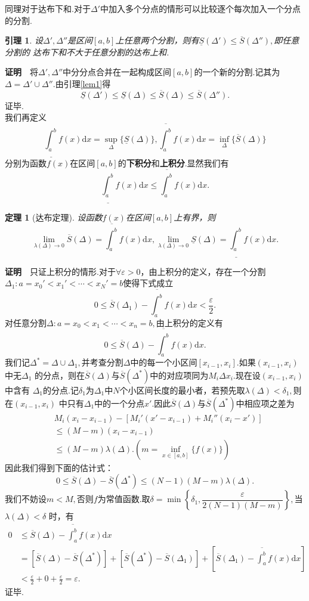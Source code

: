 \documentclass[UTF8]{article}
\newcommand{\dx}{\mathrm{d}x}
\newcommand{\zm}{\textbf{证明}$\quad$}
\newtheorem{thm}{\hspace{2em}定理}[section]
\newtheorem{lem}{\hspace{2em}引理}[section]
\begin{document}
    同理对于达布下和.对于$\Delta'$中加入多个分点的情形可以比较逐个每次加入一个分点的分割.
    \begin{lem}
      设$\Delta',\Delta''$是区间$[a,b]$上任意两个分割，则有$\underline{S}(\Delta')\le\overline{S}(\Delta''),$即任意分割的
      达布下和不大于任意分割的达布上和.
    \end{lem}
    \zm 将$\Delta',\Delta''$中分分点合并在一起构成区间$[a,b]$的一个新的分割.记其为$\Delta=\Delta'\cup\Delta''$.由引理\ref{lem1}得
    $$\underline{S}(\Delta')\le\underline{S}(\Delta)\le\overline{S}(\Delta)\le\overline{S}(\Delta'').$$证毕.\\
    我们再定义
    $$\underline{\int_a^b}f(x)\dx=\sup_\Delta\{\underline{S}(\Delta)\},\overline{\int_a^b}f(x)\dx=\inf_\Delta\{\overline{S}(\Delta)\}$$
    分别为函数$f(x)$在区间$[a,b]$的\textbf{下积分}和\textbf{上积分}.显然我们有
    $$\underline{\int_a^b}f(x)\dx\le\overline{\int_a^b}f(x)\dx.$$
    \begin{thm}[\color{red}达布定理]
      设函数$f(x)$在区间$[a,b]$上有界，则
      $$\lim_{\lambda(\Delta)\to0}\overline{S}(\Delta)=\overline{\int_a^b}f(x)\dx,
      \lim_{\lambda(\Delta)\to0}\underline{S}(\Delta)=\underline{\int_a^b}f(x)\dx.$$
    \end{thm}
    \zm 只证上积分的情形.对于$\forall\varepsilon>0$，由上积分的定义，存在一个分割$\Delta_1:a=x_0'<x_1'<\cdots<x_N'=b$使得下式成立
    $$0\le\overline{S}(\Delta_1)-\overline{\int_a^b}f(x)\dx<\frac{\varepsilon}{2}.$$
    对任意分割$\Delta:a=x_0<x_1<\cdots<x_n=b,$由上积分的定义有
    $$0\le\overline{S}(\Delta)-\overline{\int_a^b}f(x)\dx.$$
    我们记$\Delta^*=\Delta\cup\Delta_1,$并考查分割$\Delta$中的每一个小区间$[x_{i-1},x_i].$如果$(x_{i-1},x_i)$中无$\Delta_1$
    的分点，则在$\overline{S}(\Delta)$与$\overline{S}(\Delta^*)$中的对应项同为$M_i\Delta x_i.$现在设$(x_{i-1},x_i)$中含有
    $\Delta_1$的分点.记$\delta_1$为$\Delta_1$中$N$个小区间长度的最小者，若预先取$\lambda(\Delta)<\delta_1,$则在$(x_{i-1},x_i)$
    中只有$\Delta_1$中的一个分点$x'.$因此$\overline{S}(\Delta)$与$\overline{S}(\Delta^*)$中相应项之差为
    \begin{align*}
      &M_i(x_i-x_{i-1})-[M_i'(x'-x_{i-1})+M_i''(x_i-x')]\\
      &\le(M-m)(x_i-x_{i-1})\\
      &\le(M-m)\lambda(\Delta).(m=\inf_{x\in[a,b]}\{f(x)\})
    \end{align*}
    因此我们得到下面的估计式：
    $$0\le\overline{S}(\Delta)-\overline{S}(\Delta^*)\le(N-1)(M-m)\lambda(\Delta).$$
    我们不妨设$m<M,$否则$f$为常值函数.取$\delta=\min\left\{\delta_1,\dfrac{\varepsilon}{2(N-1)(M-m)}\right\},$当$\lambda(\Delta)<\delta$
    时，有
    \begin{align*}
      0&\le\overline{S}(\Delta)-\overline{\int_a^b}f(x)\dx\\
      &=[\overline{S}(\Delta)-\overline{S}(\Delta^*)]+[\overline{S}(\Delta^*)-\overline{S}(\Delta_1)]+
      [\overline{S}(\Delta_1)-\overline{\int_a^b}f(x)\dx]\\
      &<\frac{\varepsilon}{2}+0+\frac{\varepsilon}{2}=\varepsilon.
    \end{align*}
    证毕.
\clearpage
\end{document}

